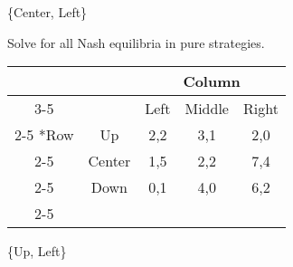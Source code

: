 \documentclass[addpoints]{exam}
\begin{document}
\begin{questions}
\begin{solution}
  \{Center, Left\}
\end{solution}

\question[4]
Solve for all Nash equilibria in pure strategies.
\begin{table}[h!]
  \centering
  \setlength{\extrarowheight}{2pt}
  \begin{tabular}{*{5}{c|}}
    \multicolumn{2}{c}{} & \multicolumn{3}{c}{Column} \\\cline{3-5}
    \multicolumn{1}{c}{} &        & Left & Middle & Right \\\cline{2-5}
    \multirow{3}*{Row}   & Up     & 2,2 & 3,1 & 2,0 \\\cline{2-5}
                         & Center & 1,5 & 2,2 & 7,4 \\\cline{2-5}
                         & Down   & 0,1 & 4,0 & 6,2 \\\cline{2-5}
  \end{tabular}
\end{table}

\begin{solution}
  \{Up, Left\}
\end{solution}

\end{questions}
\end{document}

